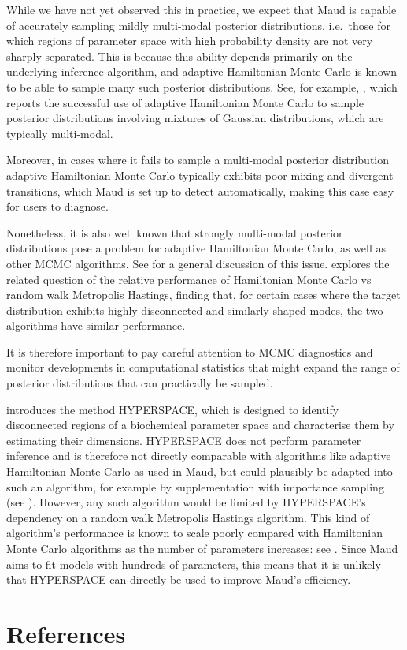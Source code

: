 \documentclass[journal=asbcd6,manuscript=article,layout=traditional]{achemso}
\begin{document}
While we have not yet observed this in practice, we expect that Maud is
capable of accurately sampling mildly multi-modal posterior
distributions, i.e.~those for which regions of parameter space with high
probability density are not very sharply separated. This is because this
ability depends primarily on the underlying inference algorithm, and
adaptive Hamiltonian Monte Carlo is known to be able to sample many such
posterior distributions. See, for example,
\citet{mangiolaSccompRobustDifferential2023}, which reports the
successful use of adaptive Hamiltonian Monte Carlo to sample posterior
distributions involving mixtures of Gaussian distributions, which are
typically multi-modal.

Moreover, in cases where it fails to sample a multi-modal posterior
distribution adaptive Hamiltonian Monte Carlo typically exhibits poor
mixing and divergent transitions, which Maud is set up to detect
automatically, making this case easy for users to diagnose.

Nonetheless, it is also well known that strongly multi-modal posterior
distributions pose a problem for adaptive Hamiltonian Monte Carlo, as
well as other MCMC algorithms. See
\citep[§3.2]{betancourtmichaelMarkovChainMonte2020} for a general
discussion of this issue. \citet{mangoubiDoesHamiltonianMonte2018}
explores the related question of the relative performance of Hamiltonian
Monte Carlo vs random walk Metropolis Hastings, finding that, for
certain cases where the target distribution exhibits highly disconnected
and similarly shaped modes, the two algorithms have similar performance.

It is therefore important to pay careful attention to MCMC diagnostics
and monitor developments in computational statistics that might expand
the range of posterior distributions that can practically be sampled.

\citet{zamora-silleroEfficientCharacterizationHighdimensional2011}
introduces the method HYPERSPACE, which is designed to identify
disconnected regions of a biochemical parameter space and characterise
them by estimating their dimensions. HYPERSPACE does not perform
parameter inference and is therefore not directly comparable with
algorithms like adaptive Hamiltonian Monte Carlo as used in Maud, but
could plausibly be adapted into such an algorithm, for example by
supplementation with importance sampling (see
\citet{vehtariParetoSmoothedImportance2022}). However, any such
algorithm would be limited by HYPERSPACE's dependency on a random walk
Metropolis Hastings algorithm. This kind of algorithm's performance is
known to scale poorly compared with Hamiltonian Monte Carlo algorithms
as the number of parameters increases: see
\citet{mangoubiDoesHamiltonianMonte2018}. Since Maud aims to fit models
with hundreds of parameters, this means that it is unlikely that
HYPERSPACE can directly be used to improve Maud's efficiency.

\section{References}\label{references}

\renewcommand{\bibsection}{}

\end{document}
